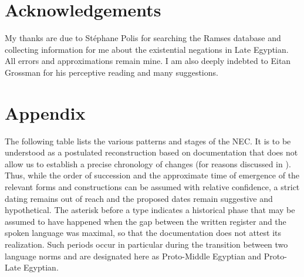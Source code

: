 \documentclass[output=paper]{langsci/langscibook}
\newcommand{\ꜥ}{ʿ}
\newcommand{\ꜣ}{\kern-.25pt\texttt{ꜣ}\kern-.6pt}
\begin{document}
\section*{Acknowledgements}
My thanks are due to Stéphane Polis for searching the Ramses database and collecting information for me about the existential negations in Late Egyptian. All errors and approximations remain mine. I am also deeply indebted to Eitan Grossman for his perceptive reading and many suggestions. 



\section*{Appendix}

The following table lists the various patterns and stages of the NEC. It is to be understood as a postulated reconstruction based on documentation that does not allow us to establish a precise chronology of changes (for reasons discussed in ). Thus, while the order of succession and the approximate time of emergence of the relevant forms and constructions can be assumed with relative confidence, a strict dating remains out of reach and the proposed dates remain suggestive and hypothetical. The asterisk before a type indicates a historical phase that may be assumed to have happened when the gap between the written register and the spoken language was maximal, so that the documentation does not attest its realization. Such periods occur in particular during the transition between two language norms and are designated here as Proto-Middle Egyptian and Proto-Late Egyptian.
\end{document}

